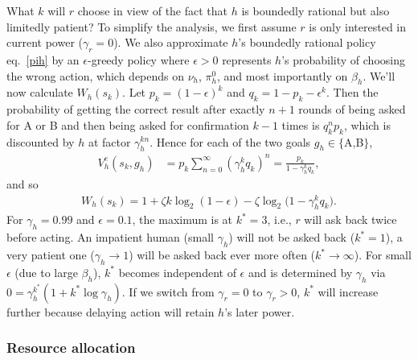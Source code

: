 \documentclass[letterpaper]{article} %
\def\ld{\log_2}
\begin{document}
What $k$ will $r$ choose in view of the fact that $h$ is boundedly rational but also limitedly patient?
To simplify the analysis, we first assume $r$ is only interested in current power ($\gamma_r=0$).
We also approximate $h$'s boundedly rational policy eq.~\eqref{pih} by an $\epsilon$-greedy policy where $\epsilon>0$ represents $h$'s probability of choosing the wrong action, which depends on $\nu_h$, $\pi^0_h$, and most importantly on $\beta_h$.
We'll now calculate $W_h(s_k)$.
Let $p_k = (1-\epsilon)^k$ and $q_k = 1 - p_k - \epsilon^k$.
Then the probability of getting the correct result after exactly $n+1$ rounds of being asked for A or B and then being asked for confirmation $k-1$ times is
$q_k^n p_k$, which is discounted by $h$ at factor $\gamma_h^{kn}$.
Hence for each of the two goals $g_h\in\{$A,B$\}$,
\begin{align*}
    V^e_h(s_k,g_h) &= p_k \sum_{n=0}^\infty (\gamma_h^k q_k)^n = \frac{p_k}{1-\gamma_h^k q_k}, 
\end{align*}
and so
\begin{align*}
    W_h(s_k) = 1 + \zeta k\ld(1-\epsilon) - \zeta\ld\big(1-\gamma_h^k q_k\big).
\end{align*}
For $\gamma_h=0.99$ and $\epsilon=0.1$, the maximum is at $k^\ast=3$, i.e., $r$ will ask back twice before acting.
An impatient human (small $\gamma_h$) will not be asked back ($k^\ast=1$), a very patient one ($\gamma_h\to 1$) will be asked back ever more often ($k^\ast\to\infty$).
For small $\epsilon$ (due to large $\beta_h$), $k^\ast$ becomes independent of $\epsilon$ and is determined by $\gamma_h$ via
$0=\gamma_h^{k^\ast}(1+k^\ast\log\gamma_h)$.
If we switch from $\gamma_r=0$ to $\gamma_r>0$, $k^\ast$ will increase further because delaying action will retain $h$'s later power.

\subsubsection*{Resource allocation}
\end{document}
